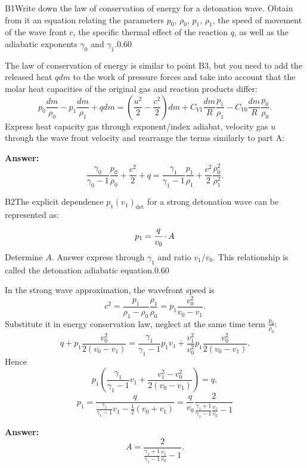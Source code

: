 \documentclass[11pt,a4paper]{article}
\begin{document}
\begin{solcard}{B1}{Write down the law of conservation of energy for a detonation wave. Obtain from it an equation relating the parameters $p_0$, $\rho_0$, $p_1$, $\rho_1$, the speed of movement of the wave front $c$, the specific thermal effect of the reaction $q$, as well as the adiabatic exponents $\gamma_0$ and $\gamma_1$.}{0.60}

The law of conservation of energy is similar to point $\mathrm{B3}$, but you need to add the released heat $q dm$ to the work of pressure forces and take into account that the molar heat capacities of the original gas and reaction products differ: $$ p_0 \frac{dm}{\rho_0} -p_1 \frac{dm}{\rho_1} + q dm = \left( \frac{u^2}{2}  -\frac{c^2}{2}\right) dm + C_{V1} \frac{dm}{R}  \frac{p_1}{\rho_1} - C_{V0} \frac{dm}{R} \frac{p_0}{\rho_0}. $$Express heat capacity gas through exponent/index adiabat, velocity gas $u$ through the wave front velocity and rearrange the terms similarly to part A:

\par\smallskip\noindent\textbf{Answer:} $$ \frac{\gamma_0}{\gamma_0 - 1} \frac{p_0}{\rho_0} + \frac{c^2}{2} + q = \frac{\gamma_1}{\gamma_1 -1} \frac{p_1}{\rho_1} + \frac{c^2}{2} \frac{\rho_0^2}{\rho_1^2}. $$
\end{solcard}

\begin{solcard}{B2}{The explicit dependence $p_1(v_1)_\text{det}$ for a strong detonation wave can be represented as: $$p_1=\cfrac{q}{v_0}\cdot A $$Determine $A$. Answer express through $\gamma_1$ and ratio $v_1/v_0$. This relationship is called the detonation adiabatic equation.}{0.60}

In the strong wave approximation, the wavefront speed is $$ c^2 = \frac{p_1}{\rho_1 - \rho_0} \frac{\rho_1}{\rho_0} = p_1 \frac{v_0^2}{v_0 - v_1}. $$Substitute it in energy conservation law, neglect at the same time term $\frac{p_0}{\rho_0}$: $$ q + p_1 \frac{v_0^2}{2(v_0 - v_1)} = \frac{\gamma_1}{\gamma_1 -1}p_1 v_1 + \frac{v_1^2 }{v_0^2} p_1 \frac{v_0^2}{2(v_0 - v_1)} . $$Hence $$ p_1 \left( \frac{\gamma_1}{\gamma_1 -1} v_1  + \frac{v_1^2 - v_0^2}{2 (v_0 - v_1)}\right) = q, $$$$ p_1 = \frac{q}{\frac{\gamma_1}{\gamma_1 -1} v_1  -  \frac{1}{2} (v_0 + v_1)} = \frac{q}{v_0} \frac{2}{\frac{\gamma_1 + 1}{\gamma_1 -1} \frac{v_1}{v_0} - 1} $$

\par\smallskip\noindent\textbf{Answer:} $$ A =  \frac{2}{\frac{\gamma_1 + 1}{\gamma_1 -1} \frac{v_1}{v_0} - 1}. $$
\end{solcard}
\end{document}
